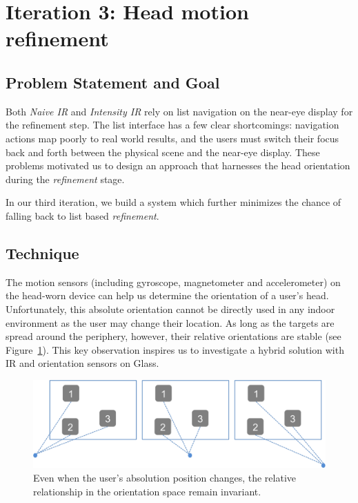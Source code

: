 \section{Iteration 3: Head motion refinement}
\label{sec:iteration-3:-head}
\subsection{Problem Statement and Goal}
Both {\em Naive IR} and {\em Intensity IR} rely on list navigation on the
near-eye display for the refinement step. The list interface has a few clear shortcomings: navigation actions map poorly to real world results, and the users must switch their focus back and forth between the physical scene and the near-eye display. These problems motivated us to design an approach that harnesses the head orientation during the {\em refinement} stage.

In our third iteration, we build a system which further minimizes the chance of
falling back to list based {\em refinement}.

\subsection{Technique}
The motion sensors (including gyroscope, magnetometer and accelerometer) on the
head-worn device can help us determine the orientation of a user's head.
Unfortunately, this absolute orientation cannot be directly used in any indoor
environment as the user may change their location. As long as the targets are
spread around the periphery, however, their relative orientations are stable
(see Figure~\ref{fig:third_principle}). This key observation inspires us to
investigate a hybrid solution with IR and orientation sensors on Glass.

\begin{figure}[t]
\centering
\includegraphics[width=1\columnwidth]{figures/third_principle.png}
\caption{Even when the user's absolution position changes, the relative relationship in the orientation space remain invariant.}
\label{fig:third_principle}
\end{figure}

